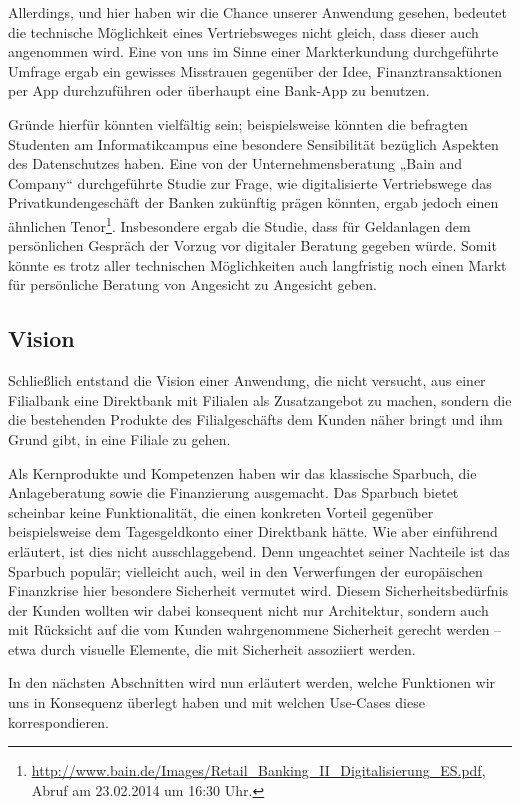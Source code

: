 	Allerdings, und hier haben wir die Chance unserer Anwendung gesehen, bedeutet die technische Möglichkeit eines Vertriebsweges nicht gleich, dass dieser auch angenommen wird. Eine von uns im Sinne einer Markterkundung durchgeführte Umfrage ergab ein gewisses Misstrauen gegenüber der Idee, Finanztransaktionen per App durchzuführen oder überhaupt eine Bank-App zu benutzen.
	
	Gründe hierfür könnten vielfältig sein; beispielsweise könnten die befragten Studenten am Informatikcampus eine besondere Sensibilität bezüglich Aspekten des Datenschutzes haben. Eine von der Unternehmensberatung „Bain and Company“ durchgeführte Studie zur Frage, wie digitalisierte Vertriebswege das Privatkundengeschäft der Banken zukünftig prägen könnten, ergab jedoch einen ähnlichen Tenor\footnote{\url{http://www.bain.de/Images/Retail\_Banking\_II\_Digitalisierung\_ES.pdf}, Abruf am 23.02.2014 um 16:30 Uhr.}. Insbesondere ergab die Studie, dass für Geldanlagen dem persönlichen Gespräch der Vorzug vor digitaler Beratung gegeben würde. Somit könnte es trotz aller technischen Möglichkeiten auch langfristig noch einen Markt für persönliche Beratung von Angesicht zu Angesicht geben.
 
\subsection{Vision}
	Schließlich entstand die Vision einer Anwendung, die nicht versucht, aus einer Filialbank eine Direktbank mit Filialen als Zusatzangebot zu machen, sondern die die bestehenden Produkte des Filialgeschäfts dem Kunden näher bringt und ihm Grund gibt, in eine Filiale zu gehen. 
	
	Als Kernprodukte und Kompetenzen haben wir das klassische Sparbuch, die Anlageberatung sowie die Finanzierung ausgemacht. Das Sparbuch bietet scheinbar keine Funktionalität, die einen konkreten Vorteil gegenüber beispielsweise dem Tagesgeldkonto einer Direktbank hätte. Wie aber einführend erläutert, ist dies nicht ausschlaggebend. Denn ungeachtet seiner Nachteile ist das Sparbuch populär; vielleicht auch, weil in den Verwerfungen der europäischen Finanzkrise hier besondere Sicherheit vermutet wird. Diesem Sicherheitsbedürfnis der Kunden wollten wir dabei konsequent nicht nur Architektur, sondern auch mit Rücksicht auf die vom Kunden wahrgenommene Sicherheit gerecht werden – etwa durch visuelle Elemente, die mit Sicherheit assoziiert werden.

	In den nächsten Abschnitten wird nun erläutert werden, welche Funktionen wir uns in Konsequenz überlegt haben und mit welchen Use-Cases diese korrespondieren.

